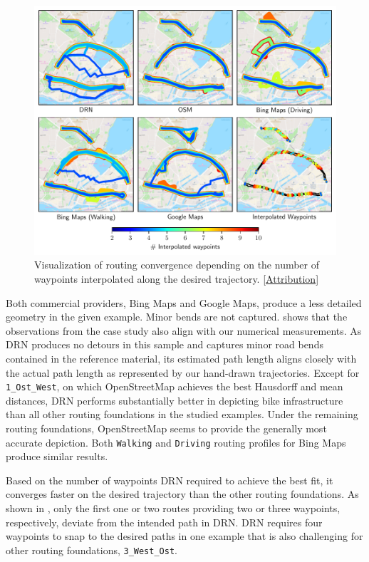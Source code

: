 \begin{figure}[t]
\centering 
\includegraphics[width=\linewidth]{images/routing-convergence-process.pdf}
\caption{Visualization of routing convergence depending on the number of waypoints interpolated along the desired trajectory. [\hyperref[attribution]{Attribution}]}
\label{fig:routing-convergence-process}
\end{figure}

Both commercial providers, Bing Maps and Google Maps, produce a less detailed geometry in the given example. Minor bends are not captured.  shows that the observations from the case study also align with our numerical measurements. As DRN produces no detours in this sample and captures minor road bends contained in the reference material, its estimated path length aligns closely with the actual path length as represented by our hand-drawn trajectories. Except for \texttt{1\_Ost\_West}, on which OpenStreetMap achieves the best Hausdorff and mean distances, DRN performs substantially better in depicting bike infrastructure than all other routing foundations in the studied examples. Under the remaining routing foundations, OpenStreetMap seems to provide the generally most accurate depiction. Both \texttt{Walking} and \texttt{Driving} routing profiles for Bing Maps produce similar results.

Based on the number of waypoints DRN required to achieve the best fit, it converges faster on the desired trajectory than the other routing foundations. As shown in , only the first one or two routes providing two or three waypoints, respectively, deviate from the intended path in DRN. DRN requires four waypoints to snap to the desired paths in one example that is also challenging for other routing foundations, \texttt{3\_West\_Ost}.

